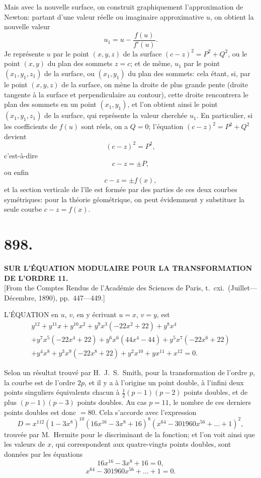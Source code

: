\documentclass[11pt,a4paper]{book}
\begin{document}
Mais avec la nouvelle surface, on construit graphiquement l'approximation de Newton: partant d'une valeur r\'eelle ou imaginaire approximative $u$, on obtient la nouvelle valeur
\[
u_1 = u - \frac{f(u)}{f'(u)}.
\]
Je repr\'esente $u$ par le point $(x, y, z)$ de la surface $(c - z)^2 = P^2 + Q^2$, ou le point $(x, y)$ du plan des sommets $z = c$; et de m\^eme, $u_1$ par le point $(x_1, y_1, z_1)$ de la surface, ou $(x_1, y_1)$ du plan des sommets: cela \'etant, si, par le point $(x, y, z)$ de la surface, on m\`ene la droite de plus grande pente (droite tangente \`a la surface et perpendiculaire au contour), cette droite rencontrera le plan des sommets en un point $(x_1, y_1)$, et l'on obtient ainsi le point $(x_1, y_1, z_1)$ de la surface, qui repr\'esente la valeur cherch\'ee $u_1$. En particulier, si les coefficients de $f(u)$ sont r\'eels, on a $Q = 0$; l'\'equation $(c - z)^2 = P^2 + Q^2$ devient
\[
(c-z)^2 = P^2,
\]
c'est-\`a-dire
\[
c - z = \pm P,
\]
ou enfin
\[
c - z = \pm f(x),
\]
et la section verticale de l'\^ile est form\'ee par des parties de ces deux courbes sym\'etriques: pour la th\'eorie g\'eom\'etrique, on peut \'evidemment y substituer la seule courbe $c - z = f(x)$.


\section*{898.}
\begin{center}
{\large\bfseries SUR L'\'EQUATION MODULAIRE POUR LA TRANSFORMATION DE L'ORDRE 11.}\\[0.5em]
\small [From the Comptes Rendus de l'Acad\'emie des Sciences de Paris, t.\ cxi.\ (Juillet---D\'ecembre, 1890), pp.\ 447---449.]
\end{center}

L'\'EQUATION en $u$, $v$, en y \'ecrivant $u = x$, $v = y$, est
\begin{multline*}
y^{12} + y^{11}x + y^{10}x^2 + y^9x^3(-22x^2 + 22) + y^8x^4 \\
+ y^7x^5(-22x^4 + 22) + y^6x^6(44x^4 - 44) + y^5x^7(-22x^6 + 22) \\
+ y^4x^8 + y^3x^9(-22x^8 + 22) + y^2x^{10} + yx^{11} + x^{12} = 0.
\end{multline*}

Selon un r\'esultat trouv\'e par H.\ J.\ S.\ Smith, pour la transformation de l'ordre $p$, la courbe est de l'ordre $2p$, et il y a \`a l'origine un point double, \`a l'infini deux points singuliers \'equivalents chacun \`a $\tfrac{1}{2}(p-1)(p-2)$ points doubles, et de plus $(p-1)(p-3)$ points doubles. Au cas $p = 11$, le nombre de ces derniers points doubles est donc $= 80$. Cela s'accorde avec l'expression
\[
D = x^{112}(1 - 3x^8)^{10}(16x^{16} - 3x^8 + 16)^8(x^{64} - 301960x^{56} + \ldots + 1)^2,
\]
trouv\'ee par M.\ Hermite pour le discriminant de la fonction; et l'on voit ainsi que les valeurs de $x$, qui correspondent aux quatre-vingts points doubles, sont donn\'ees par les \'equations
\[
16x^{16} - 3x^8 + 16 = 0,
\]
\[
x^{64} - 301960x^{56} + \ldots + 1 = 0.
\]
\end{document}
